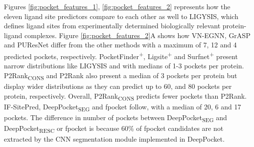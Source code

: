 Figures \ref{fig:pocket_features_1}, \ref{fig:pocket_features_2} represents how the eleven ligand site predictors compare to each other as well to LIGYSIS, which defines ligand sites from experimentally determined biologically relevant protein-ligand complexes. Figure \ref{fig:pocket_features_2}A shows how VN-EGNN, GrASP and PUResNet differ from the other methods with a maximum of 7, 12 and 4 predicted pockets, respectively. PocketFinder\textsuperscript{+}, Ligsite\textsuperscript{+} and Surfnet\textsuperscript{+} present narrow distributions like LIGYSIS and with medians of 1-3 pockets per protein. P2Rank\textsubscript{CONS} and P2Rank also present a median of 3 pockets per protein but display wider distributions as they can predict up to 60, and 80 pockets per protein, respectively. Overall, P2Rank\textsubscript{CONS} predicts fewer pockets than P2Rank. IF-SitePred, DeepPocket\textsubscript{SEG} and fpocket follow, with a median of 20, 6 and 17 pockets. The difference in number of pockets between DeepPocket\textsubscript{SEG} and DeepPocket\textsubscript{RESC} or fpocket is because 60\% of fpocket candidates are not extracted by the CNN segmentation module implemented in DeepPocket.


